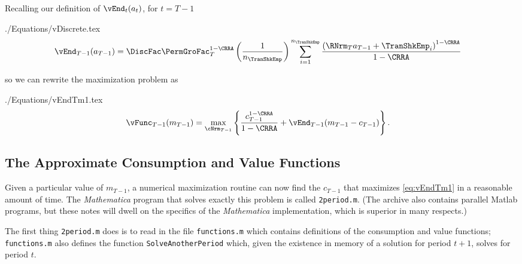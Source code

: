 \documentclass[titlepage, headings=optiontotocandhead]{\econtex}
\newcommand{\Mma}{\textit{Mathematica}}
\begin{document}
Recalling our definition of ${\vEnd}_{t}({a}_{t})$, for $t=T-1$
\begin{verbatimwrite}{./Equations/vDiscrete.tex}
  \begin{equation}\begin{gathered}\begin{aligned}
        \vEnd_{T-1}({a}_{T-1})  & =   \DiscFac \PermGroFac_{T}^{1-\CRRA}\left(\frac{1}{n_{\TranShkEmp}}\right)\sum_{i=1}^{n_{\TranShkEmp}}   \frac{\left( \RNrm_{T} {a}_{T-1} + \TranShkEmp_{i}\right)^{1-\CRRA}}{1-\CRRA} \label{eq:vDiscrete}
      \end{aligned}\end{gathered}\end{equation}
\end{verbatimwrite}
\unskip
so we can rewrite the maximization problem as 
\begin{verbatimwrite}{./Equations/vEndTm1.tex}
  \begin{equation}\begin{gathered}\begin{aligned}
        {\vFunc}_{T-1}({m}_{T-1})   & = \max_{\cNrm_{T-1}}
        \left\{
          \frac{{c}_{T-1}^{1-\CRRA}}{1-\CRRA} +
          \vEnd_{T-1}({m}_{T-1}-{c}_{T-1})
        \right\}.
        \label{eq:vEndTm1}
      \end{aligned}\end{gathered}\end{equation}
\end{verbatimwrite}
\unskip

\subsection{The Approximate Consumption and Value Functions}

Given a particular value of ${m}_{T-1}$, a numerical maximization
routine can now find the ${c}_{T-1}$ that maximizes
\eqref{eq:vEndTm1} in a reasonable amount of time.  The {\Mma} program that
solves exactly this problem is called \texttt{2period.m}.  (The archive also contains
parallel Matlab programs, but these notes will dwell on the specifics of the
{\Mma} implementation, which is superior in many respects.)

The first thing \texttt{2period.m} does is to read in the file
\texttt{functions.m} which contains definitions of the consumption and
value functions; \texttt{functions.m} also defines the function \texttt{SolveAnotherPeriod}
which, given the existence in memory of a solution for period $t+1$,
solves for period $t$.
\end{document}
